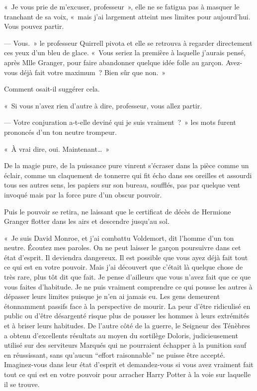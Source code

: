 «~Je vous prie de m'excuser, professeur~», elle ne se fatigua pas à masquer le tranchant de sa voix, «~mais j'ai largement atteint mes limites pour aujourd'hui.
Vous pouvez partir.

--- Vous.~»
le professeur Quirrell pivota et elle se retrouva à regarder directement ces yeux d'un bleu de glace.
«~Vous seriez la première à laquelle j'aurais pensé, après Mlle Granger, pour faire abandonner quelque idée folle au garçon.
Avez-vous déjà fait votre maximum~?
Bien sûr que non.~»

Comment osait-il suggérer cela.

«~Si vous n'avez rien d'autre à dire, professeur, vous allez partir.

--- Votre conjuration a-t-elle deviné qui je suis vraiment~?~»
les mots furent prononcés d'un ton neutre trompeur.

«~À vrai dire, oui.
Maintenant…~»

De la magie pure, de la puissance pure vinrent s'écraser dans la pièce comme un éclair, comme un claquement de tonnerre qui fit écho dans ses oreilles et assourdi tous ses autres sens, les papiers sur son bureau, soufflés, pas par quelque vent invoqué mais par la force pure d'un obscur pouvoir.

Puis le pouvoir se retira, ne laissant que le certificat de décès de Hermione Granger flotter dans les airs et descendre jusqu'au sol.

«~Je suis David Monroe, et j'ai combattu Voldemort, dit l'homme d'un ton neutre.
Écoutez mes paroles.
On ne peut laisser le garçon poursuivre dans cet état d'esprit.
Il deviendra dangereux.
Il est possible que vous ayez déjà fait tout ce qui est en votre pouvoir.
Mais j'ai découvert que c'était là quelque chose de très rare, plus tôt dit que fait.
Je pense d'ailleurs que vous n'avez fait que ce que vous faites d'habitude.
Je ne puis vraiment comprendre ce qui pousse les autres à dépasser leurs limites puisque je n'en ai jamais eu.
Les gens demeurent étonnamment passifs face à la perspective de mourir.
La peur d'être ridiculisé en public ou d'être désargenté risque plus de pousser les hommes à leurs extrémités et à briser leurs habitudes.
De l'autre côté de la guerre, le Seigneur des Ténèbres a obtenu d'excellents résultats au moyen du sortilège Doloris, judicieusement utilisé sur des serviteurs Marqués qui ne pourraient échapper à la punition sauf en réussissant, sans qu'aucun “effort raisonnable” ne puisse être accepté.
Imaginez-vous dans leur état d'esprit et demandez-vous si vous avez vraiment fait tout ce qui est en votre pouvoir pour arracher Harry Potter à la voie sur laquelle il se trouve.

